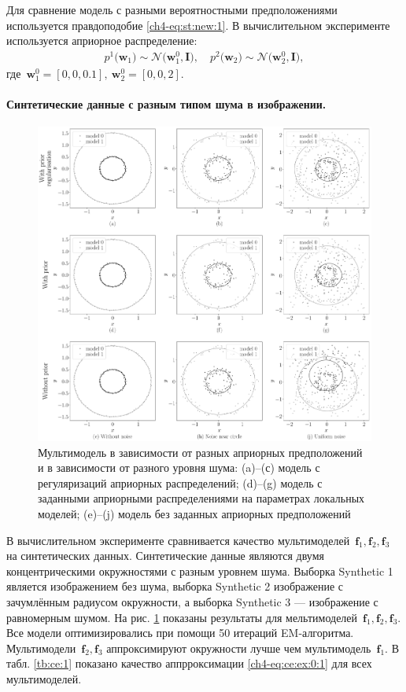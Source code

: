 Для сравнение модель с разными вероятностными предположениями используется правдоподобие  \eqref{ch4-eq:st:new:1}.
В вычислительном эксперименте используется априорное распределение:
\[
\label{ch4-eq:ce:1}
\begin{aligned}
p^{1}\bigr(\textbf{w}_1\bigr)\sim\mathcal{N}\bigr(\textbf{w}^{0}_{1}, \textbf{I}\bigr), \quad p^{2}\bigr(\textbf{w}_2\bigr)\sim\mathcal{N}\bigr(\textbf{w}^{0}_{2}, \textbf{I}\bigr),
\end{aligned}
\]
где~$\textbf{w}^{0}_1 = [0, 0, 0.1],\ \textbf{w}^{0}_2 = [0, 0, 2]$.

\paragraph{Синтетические данные с разным типом шума в изображении.}
\begin{figure}[h!t]\center
\includegraphics[width=1\textwidth]{results/priorexpert/experiment_synthetic}
\caption{Мультимодель в зависимости от разных априорных предположений и в зависимости от разного уровня шума: (a)--(с) модель с регуляризаций априорных распределений; (d)--(g) модель с заданными априорными распределениями на параметрах локальных моделей; (e)--(j) модель без заданных априорных предположений}
\label{ch4-experiment:1}
\end{figure}
В вычислительном эксперименте сравнивается качество мультимоделей~$\textbf{f}_1, \textbf{f}_2, \textbf{f}_3$ на синтетических данных.
Синтетические данные являются двумя концентрическими окружностями с разным уровнем шума.
Выборка Synthetic 1 является изображением без шума, выборка Synthetic 2 изображение с зачумлённым радиусом окружности, а выборка Synthetic 3 --- изображение с равномерным шумом.
На рис. \ref{ch4-experiment:1} показаны результаты для мельтимоделей~$\textbf{f}_1, \textbf{f}_2, \textbf{f}_3$.
Все модели оптимизировались при помощи 50 итераций EM-алгоритма.
Мультимодели~$\textbf{f}_2, \textbf{f}_3$ аппроксимируют окружности лучше чем мультимодель~$\textbf{f}_1$. В табл. \ref{tb:ce:1} показано качество аппрроксимации \eqref{ch4-eq:ce:ex:0:1} для всех мультимоделей.

